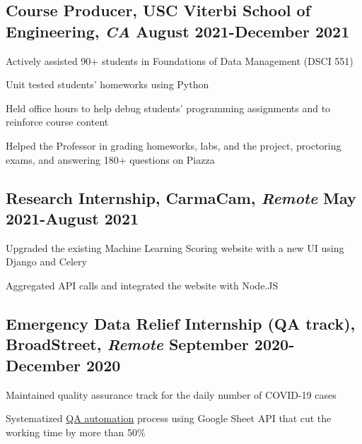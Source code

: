 \documentclass[11pt]{article}
\begin{document}
\subsection*{Course Producer{\normalfont, USC Viterbi School of Engineering,
            \textit{CA} \hfill
            August 2021-December 2021}}
\begin{compactitem}
    \item Actively assisted 90+ students in Foundations of Data Management
    (DSCI 551)
    \item Unit tested students' homeworks using Python
    \item Held office hours to help debug students' programming assignments
    and to reinforce
    course content
    \item Helped the Professor in grading homeworks, labs, and the project,
    proctoring exams, and
    answering 180+ questions on Piazza
\end{compactitem}

\subsection*{Research Internship{\normalfont, CarmaCam, \textit{Remote} \hfill May 2021-August 2021}}
\begin{compactitem}
    \item Upgraded the existing Machine Learning Scoring website with a new UI using Django and Celery
    \item Aggregated API calls and integrated the website with Node.JS
\end{compactitem}

\subsection*{Emergency Data Relief Internship (QA track){\normalfont, BroadStreet, \textit{Remote} \hfill September 2020-December 2020}}
\begin{compactitem}
    \item Maintained quality assurance track for the daily number of COVID-19 cases
    \item Systematized \href{https://github.com/Anthonyive/broadstreet-qa-automation.git}{QA automation}
    process using Google Sheet API that cut the working time by more than
    50\%
\end{compactitem}
\end{document}

